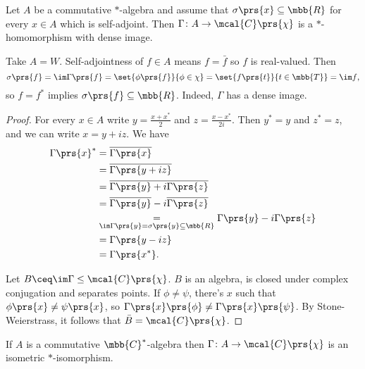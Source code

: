 \documentclass[10pt, twoside]{book}
\begin{document}
\begin{proposition}
Let $A$ be a commutative $*$-algebra and assume that $\sigma\prs{x} \subseteq \mbb{R}$ for every $x \in A$ which is self-adjoint. Then
$\Gamma \colon A \to \mcal{C}\prs{\chi}$
is a $*$-homomorphism with dense image.
\end{proposition}

\begin{example}
Take $A = W$. Self-adjointness of $f \in A$ means $f = \bar{f}$ so $f$ is real-valued. Then
\[\sigma\prs{f} = \im \Gamma\prs{f} = \set{\phi\prs{f}}{\phi \in \chi} = \set{f\prs{t}}{t \in \mbb{T}} = \im f \text{,}\]
so $f = f^*$ implies $\sigma\prs{f} \subseteq \mbb{R}$. Indeed, $\Gamma$ has a dense image.
\end{example}

\begin{proof}
For every $x \in A$ write
$y = \frac{x + x^*}{2}$ and $z = \frac{x-x^*}{2 i}$. Then $y^* = y$ and $z^* = z$, and we can write $x = y + iz$.
We have
\begin{align*}
\Gamma\prs{x}^* &= \overline{\Gamma\prs{x}}
\\&= \overline{\Gamma\prs{y+iz}}
\\&= \overline{\Gamma\prs{y} + i\Gamma\prs{z}}
\\&= \overline{\Gamma\prs{y}} - i \overline{\Gamma\prs{z}}
\\&\underset{\im \Gamma\prs{y} = \sigma\prs{y} \subseteq \mbb{R}}{=} \Gamma\prs{y} - i \Gamma\prs{z}
\\&= \Gamma\prs{y-iz}
\\&= \Gamma\prs{x^*} \text{.}
\end{align*}

Let $B \ceq \im \Gamma \leq \mcal{C}\prs{\chi}$. $B$ is an algebra, is closed under complex conjugation and separates points. If $\phi \neq \psi$, there's $x$ such that $\phi\prs{x} \neq \psi\prs{x}$, so $\Gamma\prs{x} \prs{\phi} \neq \Gamma\prs{x} \prs{\psi}$.
By Stone-Weierstrass, it follows that $\bar{B} = \mcal{C}\prs{\chi}$.
\end{proof}

\begin{theorem}
If $A$ is a commutative $\mbb{C}^*$-algebra then $\Gamma \colon A \to \mcal{C}\prs{\chi}$ is an isometric $*$-isomorphism.
\end{theorem}
\end{document}
